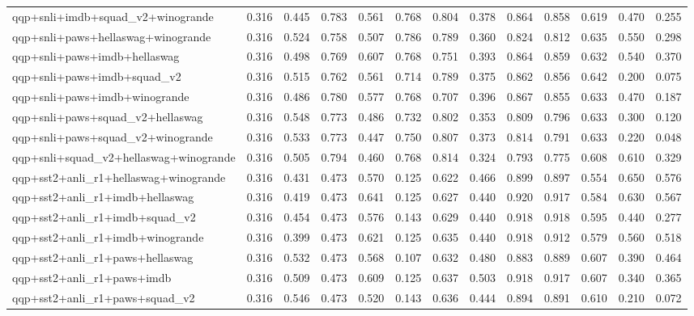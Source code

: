 \begin{table}[t]
\begin{tabular}{lrrrrrrrrrrrr}
    qqp+snli+imdb+squad\_v2+winogrande & 0.316 & 0.445 & 0.783 & 0.561 & 0.768 & 0.804 & 0.378 & 0.864 & 0.858 & 0.619 & 0.470 & 0.255 \\
    qqp+snli+paws+hellaswag+winogrande & 0.316 & 0.524 & 0.758 & 0.507 & 0.786 & 0.789 & 0.360 & 0.824 & 0.812 & 0.635 & 0.550 & 0.298 \\
    qqp+snli+paws+imdb+hellaswag & 0.316 & 0.498 & 0.769 & 0.607 & 0.768 & 0.751 & 0.393 & 0.864 & 0.859 & 0.632 & 0.540 & 0.370 \\
    qqp+snli+paws+imdb+squad\_v2 & 0.316 & 0.515 & 0.762 & 0.561 & 0.714 & 0.789 & 0.375 & 0.862 & 0.856 & 0.642 & 0.200 & 0.075 \\
    qqp+snli+paws+imdb+winogrande & 0.316 & 0.486 & 0.780 & 0.577 & 0.768 & 0.707 & 0.396 & 0.867 & 0.855 & 0.633 & 0.470 & 0.187 \\
    qqp+snli+paws+squad\_v2+hellaswag & 0.316 & 0.548 & 0.773 & 0.486 & 0.732 & 0.802 & 0.353 & 0.809 & 0.796 & 0.633 & 0.300 & 0.120 \\
    qqp+snli+paws+squad\_v2+winogrande & 0.316 & 0.533 & 0.773 & 0.447 & 0.750 & 0.807 & 0.373 & 0.814 & 0.791 & 0.633 & 0.220 & 0.048 \\
    qqp+snli+squad\_v2+hellaswag+winogrande & 0.316 & 0.505 & 0.794 & 0.460 & 0.768 & 0.814 & 0.324 & 0.793 & 0.775 & 0.608 & 0.610 & 0.329 \\
    qqp+sst2+anli\_r1+hellaswag+winogrande & 0.316 & 0.431 & 0.473 & 0.570 & 0.125 & 0.622 & 0.466 & 0.899 & 0.897 & 0.554 & 0.650 & 0.576 \\
    qqp+sst2+anli\_r1+imdb+hellaswag & 0.316 & 0.419 & 0.473 & 0.641 & 0.125 & 0.627 & 0.440 & 0.920 & 0.917 & 0.584 & 0.630 & 0.567 \\
    qqp+sst2+anli\_r1+imdb+squad\_v2 & 0.316 & 0.454 & 0.473 & 0.576 & 0.143 & 0.629 & 0.440 & 0.918 & 0.918 & 0.595 & 0.440 & 0.277 \\
    qqp+sst2+anli\_r1+imdb+winogrande & 0.316 & 0.399 & 0.473 & 0.621 & 0.125 & 0.635 & 0.440 & 0.918 & 0.912 & 0.579 & 0.560 & 0.518 \\
    qqp+sst2+anli\_r1+paws+hellaswag & 0.316 & 0.532 & 0.473 & 0.568 & 0.107 & 0.632 & 0.480 & 0.883 & 0.889 & 0.607 & 0.390 & 0.464 \\
    qqp+sst2+anli\_r1+paws+imdb & 0.316 & 0.509 & 0.473 & 0.609 & 0.125 & 0.637 & 0.503 & 0.918 & 0.917 & 0.607 & 0.340 & 0.365 \\
    qqp+sst2+anli\_r1+paws+squad\_v2 & 0.316 & 0.546 & 0.473 & 0.520 & 0.143 & 0.636 & 0.444 & 0.894 & 0.891 & 0.610 & 0.210 & 0.072 \\

\end{tabular}
\end{table}
